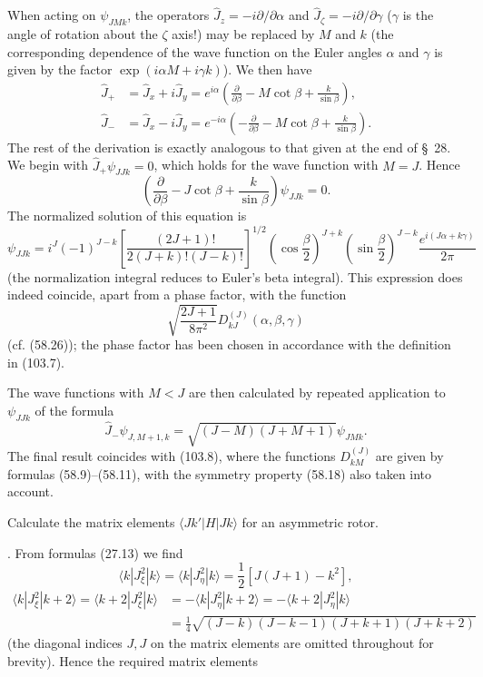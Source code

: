 When acting on $\psi_{JMk}$, the operators $\hat J_z=-i\partial/\partial\alpha$ and $\hat J_\zeta=-i\partial/\partial\gamma$ ($\gamma$ is the angle of rotation about the $\zeta$ axis!) may be replaced by $M$ and $k$ (the corresponding dependence of the wave function on the Euler angles $\alpha$ and $\gamma$ is given by the factor $\exp(i\alpha M+i\gamma k)$). We then have
\[
\begin{aligned}
 \hat J_+&=\hat J_x+i\hat J_y=e^{i\alpha}\left(\frac{\partial}{\partial\beta}-M\cot\beta+\frac{k}{\sin\beta}\right),\\
 \hat J_-&=\hat J_x-i\hat J_y=e^{-i\alpha}\left(-\frac{\partial}{\partial\beta}-M\cot\beta+\frac{k}{\sin\beta}\right).
\end{aligned}
\]
The rest of the derivation is exactly analogous to that given at the end of \S~28. We begin with $\hat J_+\psi_{JJk}=0$, which holds for the wave function with $M=J$. Hence
\[
 \left(\frac{\partial}{\partial\beta}-J\cot\beta+\frac{k}{\sin\beta}\right)\psi_{JJk}=0.
\]
The normalized solution of this equation is
\[
 \psi_{JJk}=i^J(-1)^{J-k}\left[\frac{(2J+1)!}{2(J+k)!(J-k)!}\right]^{1/2}
 \left(\cos\frac\beta2\right)^{J+k}\left(\sin\frac\beta2\right)^{J-k}
 \frac{e^{i(J\alpha+k\gamma)}}{2\pi}
\]
(the normalization integral reduces to Euler's beta integral). This expression does indeed coincide, apart from a phase factor, with the function
\[
 \sqrt{\frac{2J+1}{8\pi^2}}D_{kJ}^{(J)}(\alpha,\beta,\gamma)
\]
(cf. (58.26)); the phase factor has been chosen in accordance with the definition in (103.7).

The wave functions with $M<J$ are then calculated by repeated application to $\psi_{JJk}$ of the formula
\[
 \hat J_-\psi_{J,M+1,k}=\sqrt{(J-M)(J+M+1)}\psi_{JMk}.
\]
The final result coincides with (103.8), where the functions $D_{kM}^{(J)}$ are given by formulas (58.9)--(58.11), with the symmetry property (58.18) also taken into account.

 Calculate the matrix elements $\langle Jk'|H|Jk\rangle$ for an asymmetric rotor.

\SolutionHeading. From formulas (27.13) we find
\[
 \langle k|J_\xi^2|k\rangle=\langle k|J_\eta^2|k\rangle=\frac12[J(J+1)-k^2],
\]
\[
\begin{aligned}
 \langle k|J_\xi^2|k+2\rangle=\langle k+2|J_\xi^2|k\rangle
 &=-\langle k|J_\eta^2|k+2\rangle=-\langle k+2|J_\eta^2|k\rangle\\
 &=\frac14\sqrt{(J-k)(J-k-1)(J+k+1)(J+k+2)}
\end{aligned}
\]
(the diagonal indices $J,J$ on the matrix elements are omitted throughout for brevity). Hence the required matrix elements

